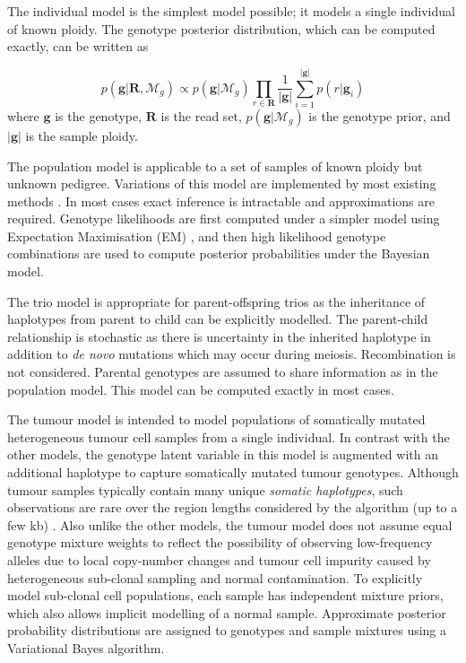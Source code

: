 \documentclass[notitlepage, twocolumn]{article}
\begin{document}
The individual model is the simplest model possible; it models a single individual of known ploidy. The genotype posterior distribution, which can be computed exactly, can be written as

\begin{equation*}
    p(\boldsymbol{g} | \boldsymbol{R}, \mathcal{M}_{g}) \propto p(\boldsymbol{g} | \mathcal{M}_{g}) \prod_{r \in \boldsymbol{R}} \frac{1}{|\boldsymbol{g}|} \sum_{i = 1}^{|\boldsymbol{g}|} p(r | \boldsymbol{g}_i)
\end{equation*}
where $\boldsymbol{g}$ is the genotype, $\boldsymbol{R}$ is the read set, $p(\boldsymbol{g} | \mathcal{M}_{g})$ is the genotype prior, and $|\boldsymbol{g}|$ is the sample ploidy.

The population model is applicable to a set of samples of known ploidy but unknown pedigree. Variations of this model are implemented by most existing methods \cite{RN538, RN141, RN5, RN537}. In most cases exact inference is intractable and approximations are required. Genotype likelihoods are first computed under a simpler model using Expectation Maximisation (EM) \cite{RN5}, and then high likelihood genotype combinations are used to compute posterior probabilities under the Bayesian model.

The trio model is appropriate for parent-offspring trios as the inheritance of haplotypes from parent to child can be explicitly modelled. The parent-child relationship is stochastic as there is uncertainty in the inherited haplotype in addition to \textit{de novo} mutations which may occur during meiosis. Recombination is not considered. Parental genotypes are assumed to share information as in the population model. This model can be computed exactly in most cases.

The tumour model is intended to model populations of somatically mutated heterogeneous tumour cell samples from a single individual. In contrast with the other models, the genotype latent variable in this model is augmented with an additional haplotype to capture somatically mutated tumour genotypes. Although tumour samples typically contain many unique \emph{somatic haplotypes}, such observations are rare over the region lengths considered by the algorithm (up to a few kb) \cite{RN86}. Also unlike the other models, the tumour model does not assume equal genotype mixture weights to reflect the possibility of observing low-frequency alleles due to local copy-number changes and tumour cell impurity caused by heterogeneous sub-clonal sampling and normal contamination. To explicitly model sub-clonal cell populations, each sample has independent mixture priors, which also allows implicit modelling of a normal sample. Approximate posterior probability distributions are assigned to genotypes and sample mixtures using a Variational Bayes algorithm.
\end{document}
